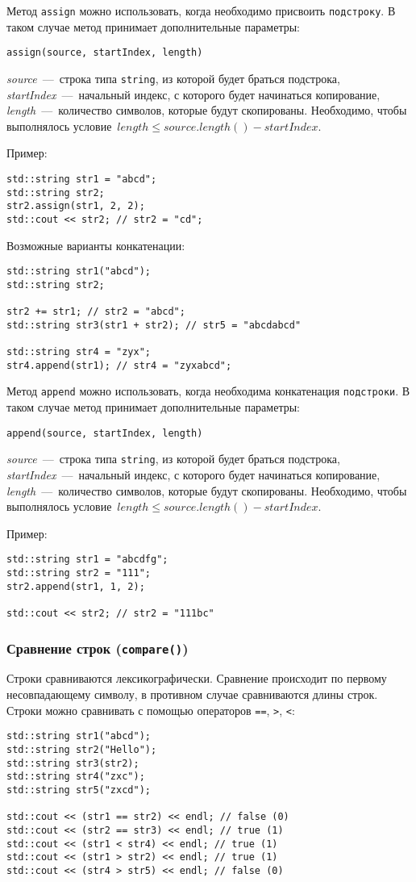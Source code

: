 Метод \lstinline|assign| можно использовать, когда необходимо присвоить \texttt{подстроку}. В таком случае метод принимает дополнительные параметры:

\lstinline|assign(source, startIndex, length)|

\textit{source}~---~строка типа \lstinline|string|, из которой будет браться подстрока, \textit{startIndex}~---~начальный индекс, с которого будет начинаться копирование, \textit{length}~---~количество символов, которые будут скопированы.
Необходимо, чтобы выполнялось условие~$length \leqslant source.length() - startIndex$.

Пример:
\begin{lstlisting}
std::string str1 = "abcd";
std::string str2;
str2.assign(str1, 2, 2);
std::cout << str2; // str2 = "cd";
\end{lstlisting}

Возможные варианты конкатенации:
\begin{lstlisting}
std::string str1("abcd");
std::string str2;

str2 += str1; // str2 = "abcd";
std::string str3(str1 + str2); // str5 = "abcdabcd"

std::string str4 = "zyx";
str4.append(str1); // str4 = "zyxabcd";
\end{lstlisting}

Метод \lstinline|append| можно использовать, когда необходима конкатенация \texttt{подстроки}. В таком случае метод принимает дополнительные параметры:

\lstinline|append(source, startIndex, length)|


\textit{source}~---~строка типа \lstinline|string|, из которой будет браться подстрока, \textit{startIndex}~---~начальный индекс, с которого будет начинаться копирование, \textit{length}~---~количество символов, которые будут скопированы.
Необходимо, чтобы выполнялось условие~$length \leqslant source.length() - startIndex$.

Пример:
\begin{lstlisting}
std::string str1 = "abcdfg";
std::string str2 = "111";
str2.append(str1, 1, 2);

std::cout << str2; // str2 = "111bc"
\end{lstlisting}

\subsubsection{Сравнение строк (\texttt{compare()})}
Строки сравниваются лексикографически. Сравнение происходит по первому несовпадающему символу, в противном случае сравниваются длины строк.
Строки можно сравнивать с помощью операторов \lstinline|==|, \lstinline|>|, \lstinline|<|:
\begin{lstlisting}
std::string str1("abcd");
std::string str2("Hello");
std::string str3(str2);
std::string str4("zxc");
std::string str5("zxcd");

std::cout << (str1 == str2) << endl; // false (0)
std::cout << (str2 == str3) << endl; // true (1)
std::cout << (str1 < str4) << endl; // true (1)
std::cout << (str1 > str2) << endl; // true (1)
std::cout << (str4 > str5) << endl; // false (0)
\end{lstlisting}

